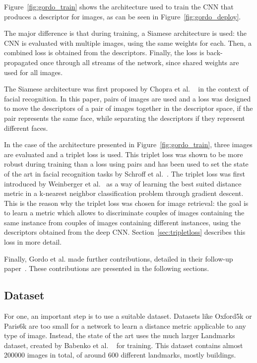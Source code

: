 Figure~\ref{fig:gordo_train} shows the architecture used to train the CNN
that produces a descriptor for images, as can be seen in
Figure~\ref{fig:gordo_deploy}.

The major difference is that during training, a Siamese architecture is
used: the CNN is evaluated with multiple images, using the same weights
for each. Then, a combined loss is obtained from the descriptors.
Finally, the loss is back-propagated once through all streams of the network,
since shared weights are used for all images.

The Siamese architecture was first proposed by Chopra et al.
~\cite{chopra_learning_2005} in the context of facial recognition.
In this paper, pairs of images are used and a loss was designed to
move the descriptors of a pair of images together in the descriptor space,
if the pair represents the same face, while separating the descriptors
if they represent different faces.

In the case of the architecture presented in Figure~\ref{fig:gordo_train},
three images are evaluated and a triplet loss is used.
This triplet loss was shown to be more robust during training than a
loss using pairs and has been used to set the state of the art
in facial recognition tasks by Schroff et al.~\cite{schroff_facenet:_2015}.
The triplet loss was first introduced by
Weinberger et al.~\cite{weinberger_distance_2006} as a way of learning
the best suited distance metric in a k-nearest neighbor classification
problem through gradient descent.
This is the reason why the triplet loss was chosen for image retrieval:
the goal is to learn a metric which allows to discriminate couples of
images containing the same instance from couples of images containing
different instances, using the descriptors obtained from the deep
CNN.
Section~\ref{sec:tripletloss} describes this loss in more detail.

Finally, Gordo et al. made further contributions, detailed in their
follow-up paper~\cite{gordo_end--end_2017}. These contributions are
presented in the following sections.

\subsection{Dataset}
For one, an important step is to use a suitable dataset. Datasets like
Oxford5k or Paris6k are too small for a network to learn a distance metric
applicable to any type of image. Instead, the state of the art uses the
much larger Landmarks dataset, created by Babenko et al.
~\cite{babenko_neural_2014} for training.
This dataset contains almost 200000 images in total, of around 600
different landmarks, mostly buildings.

